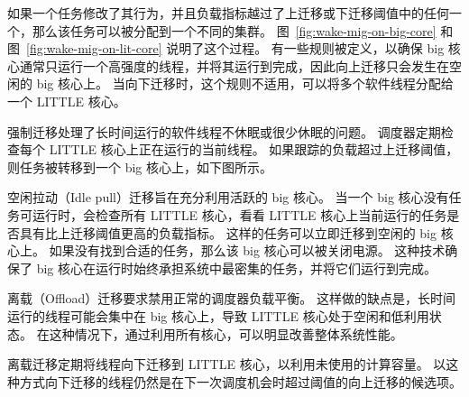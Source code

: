 

如果一个任务修改了其行为，并且负载指标越过了上迁移或下迁移阈值中的任何一个，那么该任务可以被分配到一个不同的集群。
图~\ref{fig:wake-mig-on-big-core} 和图~\ref{fig:wake-mig-on-lit-core} 说明了这个过程。
有一些规则被定义，以确保 big 核心通常只运行一个高强度的线程，并将其运行到完成，因此向上迁移只会发生在空闲的 big 核心上。
当向下迁移时，这个规则不适用，可以将多个软件线程分配给一个 LITTLE 核心。


强制迁移处理了长时间运行的软件线程不休眠或很少休眠的问题。
调度器定期检查每个 LITTLE 核心上正在运行的当前线程。
如果跟踪的负载超过上迁移阈值，则任务被转移到一个 big 核心上，如下图所示。



空闲拉动（Idle pull）迁移旨在充分利用活跃的 big 核心。
当一个 big 核心没有任务可运行时，会检查所有 LITTLE 核心，看看 LITTLE 核心上当前运行的任务是否具有比上迁移阈值更高的负载指标。
这样的任务可以立即迁移到空闲的 big 核心上。
如果没有找到合适的任务，那么该 big 核心可以被关闭电源。
这种技术确保了 big 核心在运行时始终承担系统中最密集的任务，并将它们运行到完成。


离载（Offload）迁移要求禁用正常的调度器负载平衡。
这样做的缺点是，长时间运行的线程可能会集中在 big 核心上，导致 LITTLE 核心处于空闲和低利用状态。
在这种情况下，通过利用所有核心，可以明显改善整体系统性能。

离载迁移定期将线程向下迁移到 LITTLE 核心，以利用未使用的计算容量。
以这种方式向下迁移的线程仍然是在下一次调度机会时超过阈值的向上迁移的候选项。

